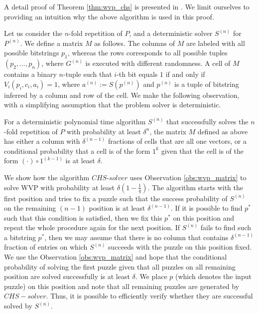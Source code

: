 \documentclass[11pt,a4paper,titlepage]{memoir}
\begin{document}
%
A detail proof of Theorem \ref{thm:wvp_chs} is presented in \cite{canetti2004hardness}.
We limit ourselves to providing an intuition why the above algorithm is used in this proof.

Let us consider the $n$-fold repetition of $P$, and a deterministic solver $S^{(n)}$ for $P^{(n)}$.
We define a matrix $M$ as follows.
The columns of $M$ are labeled with all possible bitstrings $p_1$,
whereas the rows corresponds to all possible tuples $(p_2, \dotsc, p_n)$, where $G^{(n)}$ is executed with different randomness.
A cell of $M$ contains a binary $n$-tuple such that $i$-th bit equals $1$ if and only if $V_i(p_i, c_i, a_i) = 1$, where
 $a^{(n)} := S(p^{(n)})$ and $p^{(n)}$ is a tuple of bitstring inferred by a column and row of the cell.
We make the following observation, with a simplifying assumption that the problem solver is deterministic.
\begin{observation}
\label{obs:wvp_matrix}
For a deterministic polynomial time algorithm $S^{(n)}$ that successfully solves the $n$-fold repetition of $P$ with probability at least $\delta^{n}$,
the matrix $M$ defined as above has either a column with $\delta^{(n-1)}$ fractions of cells that are all one vectors, or
a conditional probability that a cell is of the form $1^k$ given that the cell is of the form $(\cdot) \circ 1^{(k-1)}$ is at least $\delta$.
\end{observation}
%
%
We show how the algorithm $\mathit{CHS\text{-}solver}$ uses Observation \ref{obs:wvp_matrix} to solve WVP with probability at least $\delta(1 - \frac{1}{q})$.
The algorithm starts with the first position and tries to fix a puzzle such that the success probability of $S^{(n)}$ on the remaining $(n-1)$
position is at least $\delta^{(n-1)}$. If it is possible to find $p^*$ such that this condition is satisfied, then we fix this $p^*$
on this position and repeat the whole procedure again for the next position.
If $S^{(n)}$ fails to find such a bitstring $p^*$, then we may assume that there is no column that contains $\delta^{(n-1)}$ fraction
of entries on which $S^{(n)}$ succeeds with the puzzle on this position fixed.
We use the Observation \ref{obs:wvp_matrix} and hope that the conditional probability of
solving the first puzzle given that all puzzles on all remaining position are solved successfully is at least $\delta$.
We place $p$ (which denotes the input puzzle) on this position and note that all remaining puzzles are generated by $CHS-solver$.
Thus, it is possible to efficiently verify whether they are successful solved by $S^{(n)}$.
\end{document}
